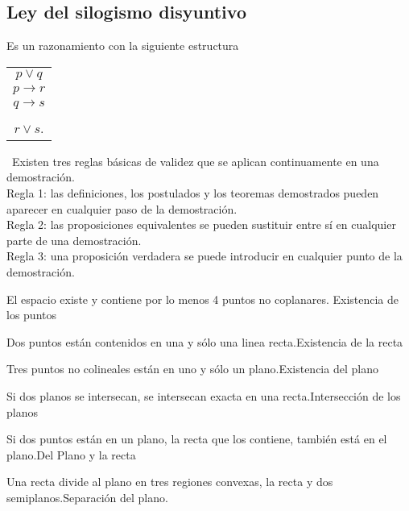 \subsection{Ley del silogismo disyuntivo}
Es un razonamiento con la siguiente estructura
\begin{center}
 \begin{tabular}{c}
$p\vee q$\\
$p\longrightarrow r$\\
$q\longrightarrow s$\\
\hline \\
$r\vee s$.\\
 \end{tabular}
\end{center}
\nota\ Existen tres reglas básicas de validez que se aplican continuamente en
una demostración.\\
Regla 1: las definiciones, los postulados y los teoremas demostrados pueden
aparecer en cualquier paso de la demostración.\\
Regla 2: las proposiciones equivalentes se pueden sustituir entre sí en
cualquier parte de una demostración.\\
Regla 3: una proposición verdadera se puede introducir en cualquier punto de la
demostración.\\
\begin{postulado}{El espacio existe y contiene por lo menos 4 puntos no
coplanares. }{Existencia de los puntos}
\end{postulado}
\begin{postulado}{Dos puntos están contenidos en una y sólo una linea
recta.}{Existencia de la recta}
\end{postulado}
\begin{postulado}{Tres puntos no colineales están en uno y sólo un
plano.}{Existencia del plano}
\end{postulado}
\begin{postulado}{Si dos planos se intersecan, se intersecan
exacta en una recta.}{Intersección de los planos}
\end{postulado}
\begin{postulado}{Si dos puntos están en un plano, la recta que los
contiene, también está en el plano.}{Del Plano y la recta}
\end{postulado}
\begin{postulado}{Una recta divide al plano en tres regiones convexas, la
recta y dos semiplanos.}{Separación del plano.}
\end{postulado}
